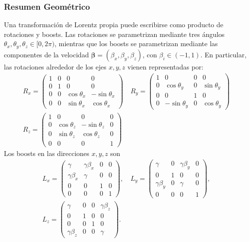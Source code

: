 \documentclass[a4paper,11pt]{book} %
\begin{document}
\subsubsection{Resumen Geométrico}
\noindent
Una transformación de Lorentz propia puede escribirse como producto de rotaciones y boosts. Las rotaciones se parametrizan mediante tres ángulos $\theta_x,\theta_y,\theta_z\in[0,2\pi)$, mientras que los boosts se parametrizan mediante las componentes de la velocidad \(\boldsymbol{\beta}=(\beta_x,\beta_y,\beta_z)\), con \(\beta_i\in(-1,1)\).
\medskip\newline
En particular, las rotaciones alrededor de los ejes \(x,y,z\) vienen representadas por:
\begin{equation}
\begin{gathered}
R_x =
\begin{pmatrix}
1 & 0 & 0 & 0 \\
0 & 1 & 0 & 0 \\
0 & 0 & \cos\theta_x & -\sin\theta_x \\
0 & 0 & \sin\theta_x & \cos\theta_x
\end{pmatrix}
\quad
R_y =
\begin{pmatrix}
1 & 0 & 0 & 0 \\
0 & \cos\theta_y & 0 & \sin\theta_y \\
0 & 0 & 1 & 0 \\
0 & -\sin\theta_y & 0 & \cos\theta_y
\end{pmatrix}
\\[1.4em]
R_z =
\begin{pmatrix}
1 & 0 & 0 & 0 \\
0 & \cos\theta_z & -\sin\theta_z & 0 \\
0 & \sin\theta_z & \cos\theta_z & 0 \\
0 & 0 & 0 & 1
\end{pmatrix}
\end{gathered}
\end{equation}
Los boosts en las direcciones \(x,y,z\) son
\begin{equation}
\begin{gathered}
L_x =
\begin{pmatrix}
\gamma & \gamma\beta_x & 0 & 0 \\
\gamma\beta_x & \gamma & 0 & 0 \\
0 & 0 & 1 & 0 \\
0 & 0 & 0 & 1
\end{pmatrix},
\quad
L_y =
\begin{pmatrix}
\gamma & 0 & \gamma\beta_y & 0 \\
0 & 1 & 0 & 0 \\
\gamma\beta_y & 0 & \gamma & 0 \\
0 & 0 & 0 & 1
\end{pmatrix},
\\[1.4em]
L_z =
\begin{pmatrix}
\gamma & 0 & 0 & \gamma\beta_z \\
0 & 1 & 0 & 0 \\
0 & 0 & 1 & 0 \\
\gamma\beta_z & 0 & 0 & \gamma
\end{pmatrix}.
\end{gathered}
\end{equation}
\end{document}

